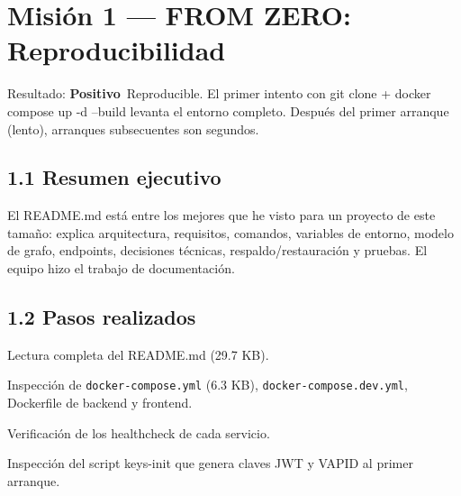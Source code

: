 \documentclass[10pt,a4paper]{article}
\newcommand{\code}[1]{\nolinkurl{#1}}
\newcommand{\badgePositivo}{\colorbox{green!20}{\textcolor{green!60!black}{\textbf{\footnotesize Positivo}}}}
\begin{document}
\section{Misión 1 --- FROM ZERO: Reproducibilidad}
Resultado: \badgePositivo\  Reproducible. El primer intento con git clone + docker compose up -d --build levanta el entorno completo. Después del primer arranque (lento), arranques subsecuentes son segundos.\par\vspace{0.4em}
\subsection{1.1 Resumen ejecutivo}
El README.md está entre los mejores que he visto para un proyecto de este tamaño: explica arquitectura, requisitos, comandos, variables de entorno, modelo de grafo, endpoints, decisiones técnicas, respaldo/restauración y pruebas. El equipo hizo el trabajo de documentación.\par\vspace{0.4em}
\subsection{1.2 Pasos realizados}
Lectura completa del README.md (29.7 KB).\par\vspace{0.4em}
Inspección de \code{docker-compose.yml} (6.3 KB), \code{docker-compose.dev.yml}, Dockerfile de backend y frontend.\par\vspace{0.4em}
Verificación de los healthcheck de cada servicio.\par\vspace{0.4em}
Inspección del script keys-init que genera claves JWT y VAPID al primer arranque.\par\vspace{0.4em}
\end{document}
